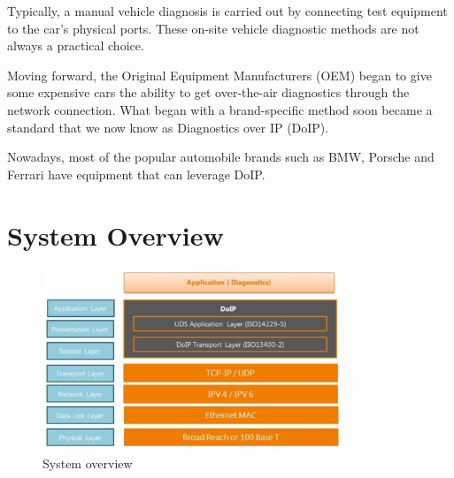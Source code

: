 Typically, a manual vehicle diagnosis is carried out by connecting test equipment to the car’s physical ports. 
These on-site vehicle diagnostic methods are not always a practical choice.

Moving forward, the Original Equipment Manufacturers (OEM) began to give some expensive cars the ability to get over-the-air 
diagnostics through the network connection. What began with a brand-specific method soon became a standard that we now know 
as Diagnostics over IP (DoIP).

Nowadays, most of the popular automobile brands such as BMW, Porsche and Ferrari have equipment that can leverage DoIP.



\newpage
\section{System Overview}

\begin{figure}[htbp]
    \centering
    \includegraphics[width=0.8\textwidth]{./pictures/systems-overview.png}
    \caption{System overview}
    \label{fig:2.2}
\end{figure}

